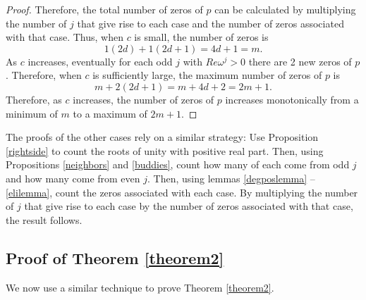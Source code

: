\documentclass{amsart}
\renewcommand{\Re}{\operatorname{Re}}
\theoremstyle{definition}
\theoremstyle{remark}
\begin{document}
\begin{proof}

Therefore, the total number of zeros of $p$ can be calculated by multiplying the number of $j$ that give rise to each case and the number of zeros associated with that case. Thus, when $c$ is small, the number of zeros is
\[
1(2d) + 1(2d + 1) = 4d + 1 = m.
\]
As $c$ increases, eventually for each odd $j$ with $Re \omega^j > 0$ there are 2 new zeros of $p$. Therefore, when $c$ is sufficiently large, the maximum number of zeros of $p$ is
\[ 
m + 2(2d+1) = m + 4d + 2 = 2m + 1.
\]
Therefore, as $c$ increases, the number of zeros of $p$ increases monotonically from a minimum of $m$ to a maximum of $2m + 1$.
\end{proof}

The proofs of the other cases rely on a similar strategy: Use Proposition \ref{rightside} to count the roots of unity with positive real part. Then, using Propositions \ref{neighbors} and \ref{buddies}, count how many of each come from odd $j$ and how many come from even $j$. Then, using lemmas \ref{degposlemma} -- \ref{elilemma}, count the zeros associated with each case. By multiplying the number of $j$ that give rise to each case by the number of zeros associated with that case, the result follows.

\subsection{Proof of Theorem \ref{theorem2}}

We now use a similar technique to prove Theorem \ref{theorem2}.
\end{document}
